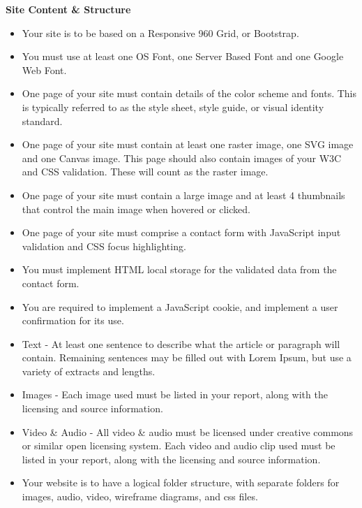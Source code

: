 \vspace{.5cm}

\textbf{Site Content \& Structure}\\

\begin{itemize}
	\item Your site is to be based on a Responsive 960 Grid, or Bootstrap.
	\item You must use at least one OS Font, one Server Based Font and one Google Web Font.
	\item One page of your site must contain details of the color scheme and fonts. This is typically referred to as the style sheet, style guide, or visual identity standard. 
	\item One page of your site must contain at least one raster image, one SVG image and one Canvas image.  This page should also contain images of your W3C and CSS validation.  These will count as the raster image.
	\item One page of your site must contain a large image and at least 4 thumbnails that control the main image when hovered or clicked.
	\item One page of your site must comprise a contact form with JavaScript input validation and CSS focus highlighting.
	\item You must implement HTML local storage for the validated data from the contact form.
	\item You are required to implement a JavaScript cookie, and implement a user confirmation for its use. 
	\item Text - At least one sentence to describe what the article or paragraph will contain.  Remaining sentences may be filled out with Lorem Ipsum, but use a variety of extracts and lengths.
	\item Images - Each image used must be listed in your report, along with the licensing and source information.   
	\item Video \& Audio - All video \& audio must be licensed under creative commons or similar open licensing system.  Each video and audio clip used must be listed in your report, along with the licensing and source information.
	\item Your website is to have a logical folder structure, with separate folders for images, audio, video, wireframe diagrams, and css files. 
\end{itemize}


